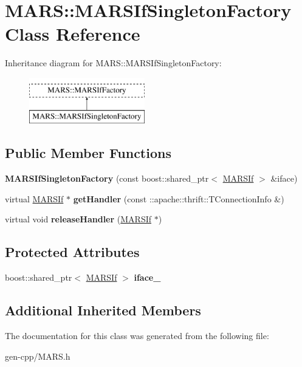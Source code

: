 \hypertarget{classMARS_1_1MARSIfSingletonFactory}{}\section{M\+A\+RS\+:\+:M\+A\+R\+S\+If\+Singleton\+Factory Class Reference}
\label{classMARS_1_1MARSIfSingletonFactory}
Inheritance diagram for M\+A\+RS\+:\+:M\+A\+R\+S\+If\+Singleton\+Factory\+:\begin{figure}[H]
\begin{center}
\leavevmode
\includegraphics[height=2.000000cm]{classMARS_1_1MARSIfSingletonFactory}
\end{center}
\end{figure}
\subsection*{Public Member Functions}
\begin{DoxyCompactItemize}
\item 
\mbox{\label{classMARS_1_1MARSIfSingletonFactory_abdd13d59a2258721e7d9056ef9725e02}} 
{\bfseries M\+A\+R\+S\+If\+Singleton\+Factory} (const boost\+::shared\+\_\+ptr$<$ \hyperlink{classMARS_1_1MARSIf}{M\+A\+R\+S\+If} $>$ \&iface)
\item 
\mbox{\label{classMARS_1_1MARSIfSingletonFactory_a50b150cc2ad9a9667dee2450358eda3b}} 
virtual \hyperlink{classMARS_1_1MARSIf}{M\+A\+R\+S\+If} $\ast$ {\bfseries get\+Handler} (const \+::apache\+::thrift\+::\+T\+Connection\+Info \&)
\item 
\mbox{\label{classMARS_1_1MARSIfSingletonFactory_a4ac0f81061299ec902ca2846ee18f6e4}} 
virtual void {\bfseries release\+Handler} (\hyperlink{classMARS_1_1MARSIf}{M\+A\+R\+S\+If} $\ast$)
\end{DoxyCompactItemize}
\subsection*{Protected Attributes}
\begin{DoxyCompactItemize}
\item 
\mbox{\label{classMARS_1_1MARSIfSingletonFactory_afc72e008c138f691860d12d20768ac77}} 
boost\+::shared\+\_\+ptr$<$ \hyperlink{classMARS_1_1MARSIf}{M\+A\+R\+S\+If} $>$ {\bfseries iface\+\_\+}
\end{DoxyCompactItemize}
\subsection*{Additional Inherited Members}


The documentation for this class was generated from the following file\+:\begin{DoxyCompactItemize}
\item 
gen-\/cpp/M\+A\+R\+S.\+h\end{DoxyCompactItemize}
